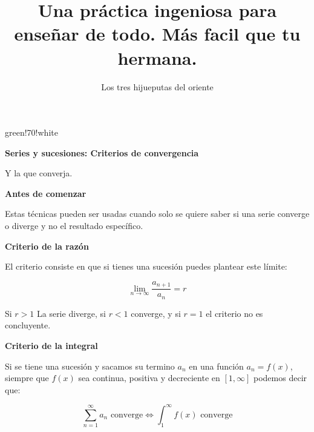 \documentclass{article}
\title{Una práctica ingeniosa para enseñar de todo. Más facil que tu hermana.}
\author{Los tres hijueputas del oriente}
\newenvironment{formula-box}{
	\begin{tcolorbox}[
		colframe=black, %
		colback=white, %
		arc=1mm, %
		boxrule=1pt, %
		left=2mm, %
		right=2mm, %
		top=2mm, %
		bottom=2mm, %
		]
	}{
	\end{tcolorbox}
}
\newenvironment{title-box}[1]{
	\begin{tcolorbox}[
		colframe=white, %
		colback=white, %
		arc=1mm, %
		left=2mm, %
		right=2mm, %
		top=2mm, %
		bottom=2mm, %
		borderline={0.5mm}{0mm}{#1,dashed},
		enhanced,
		boxrule=0.5mm,
		]
	}{
	\end{tcolorbox}
}
\begin{document}
	
	
	\begin{multicols}{2}
		\begin{title-box}{green!70!white}
			{\raggedright \large \textbf{Series y sucesiones: Criterios de convergencia} \par}
			
			\vspace{2mm}
			
			\begin{title-sign}\end{title-sign}
			
			\vspace{5mm}
			
			 Y la que converja. 
		\end{title-box}
		
		\vfill
		
		\begin{formula-box}
			{\raggedright \large \textbf{Antes de comenzar} \par}
			
			Estas técnicas pueden ser usadas cuando solo se quiere saber si una serie converge o diverge y no el resultado específico.
		\end{formula-box}
		
		\begin{formula-box}
			{\raggedright \large \textbf{Criterio de la razón} \par}
			
			El criterio consiste en que si tienes una sucesión puedes plantear este límite:
			
			\[
			\lim_{n \rightarrow \infty } \frac{a_{n+1}}{a_n} = r
			\]
			
			Si $r > 1$ La serie diverge, si $r < 1$ converge, y si $r = 1$ el criterio no es concluyente.
		\end{formula-box}
		
		\begin{formula-box}
			{\raggedright \large \textbf{Criterio de la integral} \par}
			
			Si se tiene una sucesión y sacamos su termino $a_n$ en una función $a_n = f(x)$, siempre que $f(x)$ sea continua, positiva y decreciente en $[1, \infty]$ podemos decir que:
			
			\[
			\sum_{n=1}^{\infty} a_n \text{ converge} \iff \int_{1}^{\infty} f(x) \text{ converge}
			\]
		\end{formula-box}
		

\end{multicols}
\end{document}

